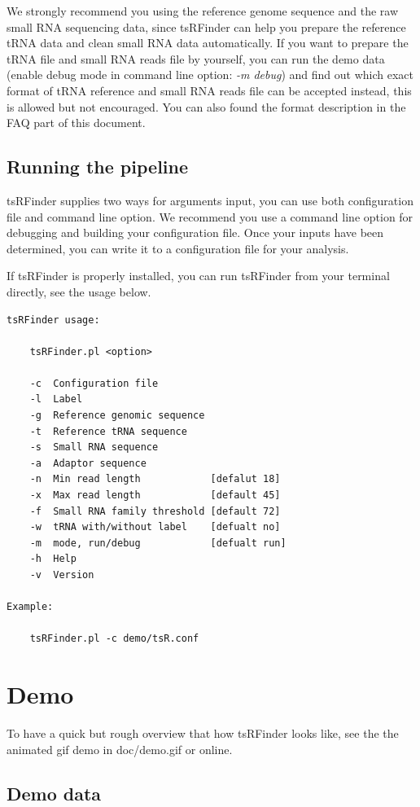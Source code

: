 \documentclass[11pt, a4paper]{article}
\begin{document}
We strongly recommend you using the reference genome sequence and the raw small RNA sequencing data, since tsRFinder can help you prepare the reference tRNA data and clean small RNA data automatically. If you want to prepare the tRNA file and small RNA reads file by yourself, you can run the demo data (enable debug mode in command line option: \emph{-m debug}) and find out which exact format of tRNA reference and small RNA reads file can be accepted instead, this is allowed but not encouraged. You can also found the format description in the FAQ part of this document.

\subsection{Running the pipeline}

tsRFinder supplies two ways for arguments input, you can use both configuration file and command line option. We recommend you use a command line option for debugging and building your configuration file. Once your inputs have been determined, you can write it to a configuration file for your analysis.

If tsRFinder is properly installed, you can run tsRFinder from your terminal directly, see the usage below.

{\small \begin{verbatim}
tsRFinder usage:

    tsRFinder.pl <option>

    -c  Configuration file
    -l  Label
    -g  Reference genomic sequence
    -t  Reference tRNA sequence
    -s  Small RNA sequence
    -a  Adaptor sequence
    -n  Min read length            [defalut 18]
    -x  Max read length            [default 45]
    -f  Small RNA family threshold [default 72]
    -w  tRNA with/without label    [defualt no]
    -m  mode, run/debug            [defualt run]
    -h  Help
    -v  Version

Example:

    tsRFinder.pl -c demo/tsR.conf
\end{verbatim}}

\section{Demo}

To have a quick but rough overview that how tsRFinder looks like, see the the animated gif demo in doc/demo.gif or online.

\subsection{Demo data}
\end{document}

